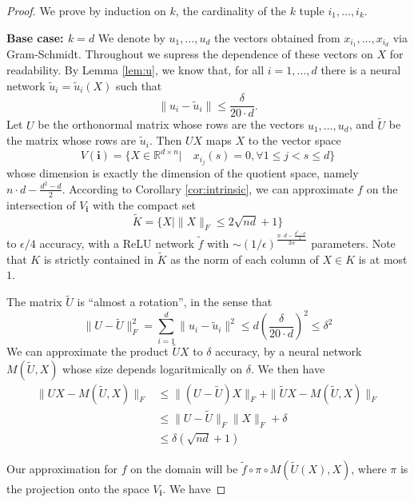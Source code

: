 \documentclass[twoside,11pt]{article}
\newcommand{\RR}{\mathbb{R}}
\begin{document}
\begin{proof}
We prove by induction on $k$, the cardinality of the $k$ tuple $i_1,\ldots,i_k $. 

\textbf{Base case: $k=d$} We denote by $u_1,\ldots,u_d$  the vectors obtained from $x_{i_1},\ldots,x_{i_d}$ via Gram-Schmidt. Throughout we supress the dependence of these vectors on $X$ for readability.  By Lemma \ref{lem:u}, we know that, for all $i=1,\ldots,d$ there is a neural network $\tilde u_i=\tilde u_i(X) $ such that 
\begin{equation}\label{eq:utilde}\|u_i-\tilde u_i\| \leq \frac{\delta}{20\cdot d}. \end{equation}
Let $U$ be the orthonormal matrix whose rows are the vectors $u_1,\ldots,u_d$, and $\tilde{U}$ be the matrix whose rows are $\tilde u_i$. Then $UX$ maps $X$ to the vector space 
$$V(\mathbf{i})=\{X\in \RR^{d\times n}| \quad x_{i_j}(s)=0, \forall 1\leq j<s \leq d \} $$
whose dimension is exactly the dimension of the quotient space, namely  $n\cdot d -\frac{d^2-d}{2} $. According to Corollary \ref{cor:intrinsic}, we can approximate $f$ on the intersection of $V_{\mathbf{i}}$ with the compact set 
$$\tilde K=\{X| \|X\|_F\leq 2\sqrt{nd}+1 \}$$
to $\epsilon/4$ accuracy, with a ReLU network $\tilde f$ with $\sim (1/\epsilon)^{\frac{n\cdot d -\frac{d^2-d}{2} }{2\alpha}}$
parameters. Note that $K$ is strictly contained in $\tilde K$ as the norm of each column of $X\in K$ is at most $1$. 

The matrix $\tilde U$ is ``almost a rotation'', in the sense that 
\begin{equation}\label{eq:Utilde}
\|U-\tilde U\|_F^2=\sum_{i=1}^d \|u_i-\tilde u_i\|^2\leq d\left(\frac{\delta}{20\cdot d} \right)^2 \leq \delta^2\end{equation}
 We can approximate the product $\tilde{U}X $ to $\delta$ accuracy, by a neural network $M(\tilde U,X)$ whose size depends logaritmically on $\delta$. We then have 
\begin{align*}\|UX-M(\tilde U,X)\|_F
&\leq \|(U-\tilde U)X\|_F+\|\tilde UX-M(\tilde U,X)\|_F\\
&\leq \|U-\tilde U\|_F\|X\|_F+\delta\\
&\leq \delta(\sqrt{nd}+1)
\end{align*}


Our approximation for $f$ on the domain will be $\tilde f\circ \pi \circ M\left(\tilde{U}(X), X \right) $, where $\pi$ is the projection onto the space $V_{\mathbf{i}}$. We have


\end{proof}
\end{document}
